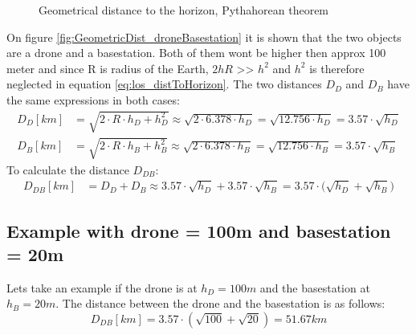 \begin{figure}%
    \centering
    \qquad
    \caption{Geometrical distance to the horizon, Pythahorean theorem}%
    \label{fig:GeometricDistanceToHorizon}%
\end{figure}

On figure \ref{fig:GeometricDist_droneBasestation} it is shown that the two objects are a drone and a basestation. Both of them wont be higher then approx 100 meter and since R is radius of the Earth, $2hR$ >> $h^2$ and $h^2$ is therefore neglected in equation \ref{eq:los_distToHorizon}. The two distances $D_D$ and $D_B$ have the same expressions in both cases:
\begin{align*}
D_D [km] &= \sqrt{2\cdot R \cdot h_D + h_{D}^2} \approx \sqrt{2\cdot 6.378\cdot h_D} = \sqrt{12.756\cdot h_D} = 3.57\cdot \sqrt{h_D} \\
D_B [km] &= \sqrt{2\cdot R \cdot h_B + h_{B}^2} \approx \sqrt{2\cdot 6.378\cdot h_B} = \sqrt{12.756\cdot h_B} = 3.57\cdot \sqrt{h_B}
\end{align*}
To calculate the distance $D_{DB}$:
\begin{align}
D_{DB}[km] &= D_D + D_B \approx 3.57\cdot \sqrt{h_D} + 3.57\cdot \sqrt{h_B} = {3.57\cdot (\sqrt{h_D} + \sqrt{h_B}} )
\end{align}

\subsection{Example with drone = 100m and basestation = 20m}
Lets take an example if the drone is at $h_D = 100m$ and the basestation at $h_B = 20m$. The distance between the drone and the basestation is as follows:
\begin{equation*}
D_{DB}[km] = 3.57\cdot (\sqrt{100} + \sqrt{20}) = 51.67km
\end{equation*}
